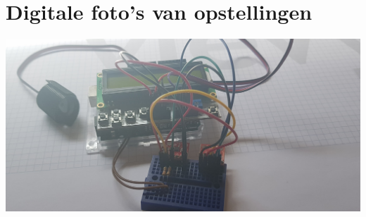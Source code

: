 \documentclass[a4paper]{report}
\begin{document}
\section{Digitale foto’s van opstellingen}
\includegraphics[width=\textwidth]{Fysieke_Voorstelling1}\\
\end{document}
